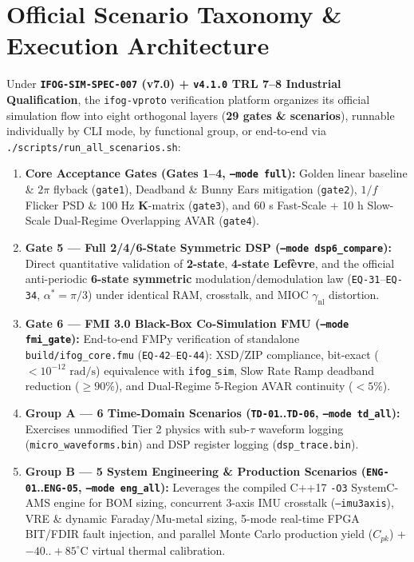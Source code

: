 \documentclass[11pt,a4paper]{article}
\begin{document}
\vspace{0.4em}
\tableofcontents
\newpage

\section{Official Scenario Taxonomy \& Execution Architecture}

Under \textbf{\texttt{IFOG-SIM-SPEC-007} (v7.0) + \texttt{v4.1.0} TRL 7--8 Industrial Qualification}, the \texttt{ifog-vproto} verification platform organizes its official simulation flow into eight orthogonal layers (\textbf{29 gates \& scenarios}), runnable individually by CLI mode, by functional group, or end-to-end via \texttt{./scripts/run\_all\_scenarios.sh}:

\begin{enumerate}
    \item \textbf{Core Acceptance Gates (Gates 1--4, \texttt{--mode full}):} Golden linear baseline \& $2\pi$ flyback (\texttt{gate1}), Deadband \& Bunny Ears mitigation (\texttt{gate2}), $1/f$ Flicker PSD \& $100\text{ Hz}$ $\mathbf{K}$-matrix (\texttt{gate3}), and 60 s Fast-Scale + 10 h Slow-Scale Dual-Regime Overlapping AVAR (\texttt{gate4}).
    \item \textbf{Gate 5 --- Full 2/4/6-State Symmetric DSP (\texttt{--mode dsp6\_compare}):} Direct quantitative validation of \textbf{2-state}, \textbf{4-state Lef\`evre}, and the official anti-periodic \textbf{6-state symmetric} modulation/demodulation law (\texttt{EQ-31}--\texttt{EQ-34}, $\alpha^* = \pi/3$) under identical RAM, crosstalk, and MIOC $\gamma_{\text{nl}}$ distortion.
    \item \textbf{Gate 6 --- FMI 3.0 Black-Box Co-Simulation FMU (\texttt{--mode fmi\_gate}):} End-to-end FMPy verification of standalone \texttt{build/ifog\_core.fmu} (\texttt{EQ-42}--\texttt{EQ-44}): XSD/ZIP compliance, bit-exact ($<10^{-12}\text{ rad/s}$) equivalence with \texttt{ifog\_sim}, Slow Rate Ramp deadband reduction ($\ge 90\%$), and Dual-Regime 5-Region AVAR continuity ($<5\%$).
    \item \textbf{Group A --- 6 Time-Domain Scenarios (\texttt{TD-01}..\texttt{TD-06}, \texttt{--mode td\_all}):} Exercises unmodified Tier 2 physics with sub-$\tau$ waveform logging (\texttt{micro\_waveforms.bin}) and DSP register logging (\texttt{dsp\_trace.bin}).
    \item \textbf{Group B --- 5 System Engineering \& Production Scenarios (\texttt{ENG-01}..\texttt{ENG-05}, \texttt{--mode eng\_all}):} Leverages the compiled C++17 \texttt{-O3} SystemC-AMS engine for BOM sizing, concurrent 3-axis IMU crosstalk (\texttt{--imu3axis}), VRE \& dynamic Faraday/Mu-metal sizing, 5-mode real-time FPGA BIT/FDIR fault injection, and parallel Monte Carlo production yield ($C_{pk}$) + $-40..+85^\circ\text{C}$ virtual thermal calibration.

\end{enumerate}
\end{document}
